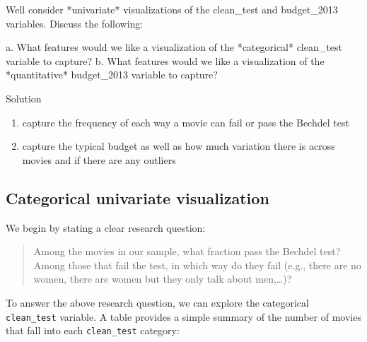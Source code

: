 \documentclass[
  letterpaper,
  DIV=11,
  numbers=noendperiod]{scrreprt}
\newenvironment{Shaded}{\begin{snugshade}}{\end{snugshade}}
\newcommand{\FunctionTok}[1]{\textcolor[rgb]{0.28,0.35,0.67}{#1}}
\newcommand{\NormalTok}[1]{\textcolor[rgb]{0.00,0.23,0.31}{#1}}
\newcommand{\SpecialCharTok}[1]{\textcolor[rgb]{0.37,0.37,0.37}{#1}}
\providecommand{\tightlist}{%
  \setlength{\itemsep}{0pt}\setlength{\parskip}{0pt}}\usepackage{longtable,booktabs,array}
\begin{document}
\hfill\break

\begin{Shaded}
\begin{Highlighting}[]
\NormalTok{We\textquotesingle{}ll consider *univariate* visualizations of the \textasciigrave{}clean\_test\textasciigrave{} and \textasciigrave{}budget\_2013\textasciigrave{} variables. Discuss the following:}
  
\NormalTok{  a. What features would we like a visualization of the *categorical* \textasciigrave{}clean\_test\textasciigrave{} variable to capture?    }
\NormalTok{  b. What features would we like a visualization of the *quantitative* \textasciigrave{}budget\_2013\textasciigrave{} variable to capture?    }
\end{Highlighting}
\end{Shaded}

Solution

\begin{enumerate}
\def\labelenumi{\alph{enumi}.}
\tightlist
\item
  capture the frequency of each way a movie can fail or pass the Bechdel
  test
\item
  capture the typical budget as well as how much variation there is
  across movies and if there are any outliers
\end{enumerate}

\hfill\break

\subsection*{Categorical univariate
visualization}\label{categorical-univariate-visualization}

We begin by stating a clear research question:

\begin{quote}
Among the movies in our sample, what fraction pass the Bechdel test?
Among those that fail the test, in which way do they fail (e.g., there
are no women, there are women but they only talk about men,\ldots)?
\end{quote}

To answer the above research question, we can explore the categorical
\texttt{clean\_test} variable. A table provides a simple summary of the
number of movies that fall into each \texttt{clean\_test} category:

\begin{Shaded}
\end{Shaded}
\end{document}
